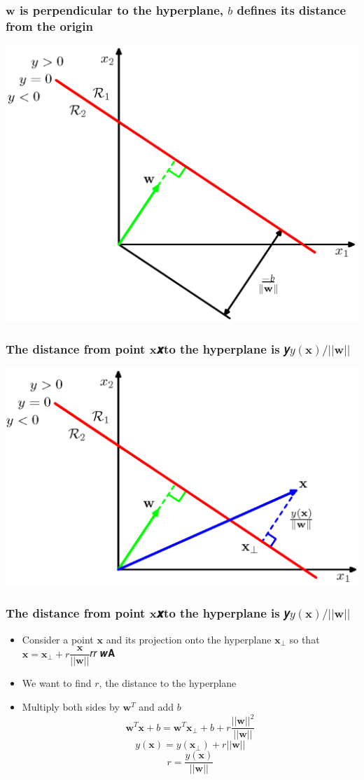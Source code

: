 \documentclass[12pt,notes,mathserif]{beamer}
\begin{document}
\begin{frame}[c]
\frametitle{$\bm{w}$ is perpendicular to the hyperplane, $b$ defines its distance from the origin}
\begin{center}
\includegraphics[width=0.7\linewidth]{fig8/lec815.jpg}
\end{center}
\end{frame}


\begin{frame}[c]
\frametitle{The distance from point $\bm{x}$𝒙to the hyperplane is 𝑦$y(\bm{x})/||\bm{w}||$}
\begin{center}
\includegraphics[width=0.7\linewidth]{fig8/lec816.jpg}
\end{center}
\end{frame}



\begin{frame}[c]
\frametitle{The distance from point $\bm{x}$𝒙to the hyperplane is 𝑦$y(\bm{x})/||\bm{w}||$}
\begin{itemize}
\item Consider a point $\bm{x}$ and its projection onto the hyperplane $\bm{x}_{\bot}$ so that $\bm{x}=\bm{x}_{\bot}+r\dfrac{\bm{x}}{||\bm{w}||}$𝑟𝑟
𝒘𝐀
\item We want to find $r$, the distance to the hyperplane
\item Multiply both sides by $\bm{w}^T$ and add $b$
\[
\bm{w}^T\bm{x}+b=
\bm{w}^T\bm{x}_{\bot} +b+r\dfrac{||\bm{w}||^2}{||\bm{w}||} 
\]
\[
y(\bm{x})=y(\bm{x}_{\bot})+r||\bm{w}||
\]
\[
r=\dfrac{y(\bm{x})}{||\bm{w}||}
\]
\end{itemize}
\end{frame}
\end{document}
